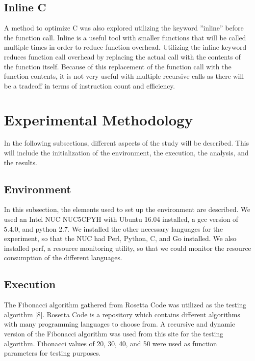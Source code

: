 \documentclass{sig-alternate}
\begin{document}
\subsection{Inline C}

A method to optimize C was also explored utilizing the keyword ''inline'' before the function call. Inline is a useful tool with smaller functions that will be called multiple times in order to reduce function overhead. Utilizing the inline keyword reduces function call overhead by replacing the actual call with the contents of the function itself. Because of this replacement of the function call with the function contents, it is not very useful with multiple recursive calls as there will be a tradeoff in terms of instruction count and efficiency.

\section{Experimental Methodology}

In the following subsections, different aspects of the study will be described. This will include the initialization of the environment, the execution, the analysis, and the results.

\subsection{Environment}

In this subsection, the elements used to set up the environment are described. We used an Intel NUC NUC5CPYH with Ubuntu 16.04 installed, a gcc version of 5.4.0, and python 2.7. We installed the other necessary languages for the experiment, so that the NUC had Perl, Python, C, and Go installed. We also installed perf, a resource monitoring utility, so that we could monitor the resource consumption of the different languages. 

\subsection{Execution}

The Fibonacci algorithm gathered from Rosetta Code was utilized as the testing algorithm [8]. Rosetta Code is a repository which contains different algorithms with many programming languages to choose from. A recursive and dynamic version of the Fibonacci algorithm was used from this site for the testing algorithm. Fibonacci values of 20, 30, 40, and 50 were used as function parameters for testing purposes.
\end{document}
